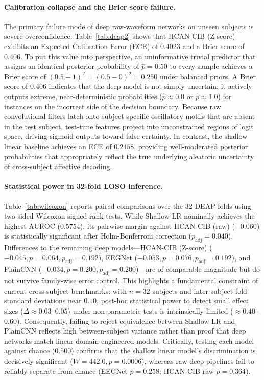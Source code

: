 \documentclass[a4paper,fleqn]{cas-sc}
\begin{document}
\paragraph{Calibration collapse and the Brier score failure.}
The primary failure mode of deep raw-waveform networks on unseen subjects is severe overconfidence. Table~\ref{tab:deap2} shows that HCAN-CIB (Z-score) exhibits an Expected Calibration Error (ECE) of $0.4023$ and a Brier score of $0.406$. To put this value into perspective, an uninformative trivial predictor that assigns an identical posterior probability of $\hat{p} = 0.50$ to every sample achieves a Brier score of $(0.5 - 1)^2 = (0.5 - 0)^2 = 0.250$ under balanced priors. A Brier score of $0.406$ indicates that the deep model is not simply uncertain; it actively outputs extreme, near-deterministic probabilities ($\hat{p} \approx 0.0$ or $\hat{p} \approx 1.0$) for instances on the incorrect side of the decision boundary. Because raw convolutional filters latch onto subject-specific oscillatory motifs that are absent in the test subject, test-time features project into unconstrained regions of logit space, driving sigmoid outputs toward false certainty. In contrast, the shallow linear baseline achieves an ECE of $0.2458$, providing well-moderated posterior probabilities that appropriately reflect the true underlying aleatoric uncertainty of cross-subject affective decoding.

\paragraph{Statistical power in 32-fold LOSO inference.}
Table~\ref{tab:wilcoxon} reports paired comparisons over the 32 DEAP folds using two-sided Wilcoxon signed-rank tests. While Shallow LR nominally achieves the highest AUROC ($0.5754$), its pairwise margin against HCAN-CIB (raw) ($-0.060$) is statistically significant after Holm-Bonferroni correction ($p_{\mathrm{adj}}=0.040$). Differences to the remaining deep models---HCAN-CIB (Z-score) ($-0.045, p=0.064, p_{\mathrm{adj}}=0.192$), EEGNet ($-0.053, p=0.076, p_{\mathrm{adj}}=0.192$), and PlainCNN ($-0.034, p=0.200, p_{\mathrm{adj}}=0.200$)---are of comparable magnitude but do not survive family-wise error control. This highlights a fundamental constraint of current cross-subject benchmarks: with $n=32$ subjects and inter-subject fold standard deviations near $0.10$, post-hoc statistical power to detect small effect sizes ($\Delta \approx 0.03$--$0.05$) under non-parametric tests is intrinsically limited ($\approx 0.40$--$0.60$). Consequently, failing to reject equivalence between Shallow LR and PlainCNN reflects high between-subject variance rather than proof that deep networks match linear domain-engineered models. Critically, testing each model against chance ($0.500$) confirms that the shallow linear model's discrimination is decisively significant ($W=442.0, p=0.0006$), whereas raw deep pipelines fail to reliably separate from chance (EEGNet $p=0.258$; HCAN-CIB raw $p=0.364$).
\end{document}
